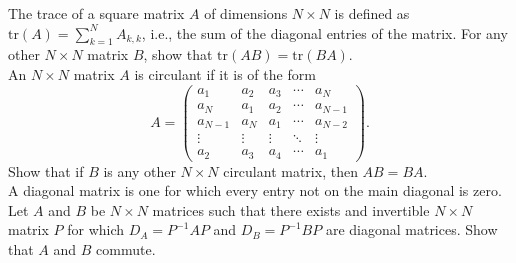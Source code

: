 \documentclass[a4paper,11pt]{article}
\begin{document}
 The trace of a square matrix $A$ of dimensions
$N \times N$ is defined as $\text{tr}(A)=\sum_{k=1}^NA_{k,k}$, i.e., the sum of
the diagonal entries of the matrix. For any other $N \times N$ matrix $B$, show
that $\text{tr}(AB)=\text{tr}(BA)$. \\

 An $N \times N$ matrix $A$ is circulant if it is
of the form
\[
  A=\begin{pmatrix}
      a_1 & a_2 & a_3 & \cdots & a_N \\
      a_N & a_1 & a_2 & \cdots & a_{N-1} \\
      a_{N-1} & a_N & a_1 & \cdots & a_{N-2} \\
      \vdots & \vdots & \vdots & \ddots & \vdots \\
      a_2 & a_3 & a_4 & \cdots & a_1
    \end{pmatrix}.
\]
Show that if $B$ is any other $N \times N$ circulant matrix, then $AB=BA$. \\

 A diagonal matrix is one for which every entry
not on the main diagonal is zero. Let $A$ and $B$ be $N \times N$ matrices such
that there exists and invertible $N \times N$ matrix $P$ for which
$D_A=P^{-1}AP$ and $D_B=P^{-1}BP$ are diagonal matrices. Show that $A$ and $B$
commute.
\end{document}
